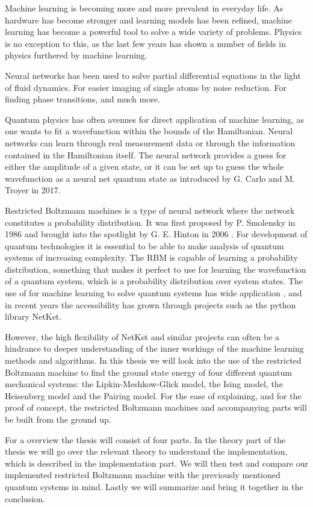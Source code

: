 Machine learning is becoming more and more prevalent in everyday life. As hardware has become stronger and learning models has been refined, machine learning has become a powerful tool to solve a wide variety of problems. Physics is no exception to this, as the last few years has shown a number of fields in physics furthered by machine learning. 

Neural networks has been used to solve partial differential equations in the light of fluid dynamics\cite{RAISSI2019686}. For easier imaging of single atoms by noise reduction\cite{PhysRevApplied.14.014011}. For finding phase transitions\cite{vanNieuwenburg2017}, and much more.

Quantum physics has often avenues for direct application of machine learning, as one wants to fit a wavefunction within the bounds of the Hamiltonian. Neural networks can learn through real measurement data or through the information contained in the Hamiltonian itself. The neural network provides a guess for either the amplitude of a given state, or it can be set up to guess the whole wavefunction as a neural net quantum state as introduced by G. Carlo and M. Troyer in 2017\cite{Carleo_2017}.

Restricted Boltzmann machines is a type of neural network where the network constitutes a probability distribution. It was first proposed by P. Smolensky in 1986 \cite{paul} and brought into the spotlight by G. E. Hinton in 2006 \cite{gehinton}. For development of quantum technologies it is essential to be able to make analysis of quantum systems of increasing complexity. The RBM is capable of learning a probability distribution, something that makes it perfect to use for learning the wavefunction of a quantum system, which is a probability distribution over system states. The use of for machine learning to solve quantum systems has wide application \cite{Xia2018}\cite{PhysRevLett.108.058301}, and in recent years the accessibility has grown through projects such as the python library NetKet\cite{netket3:2022}\cite{netket2:2019}\cite{mpi4jax:2021}. 

However, the high flexibility of NetKet and similar projects can often be a hindrance to deeper understanding of the inner workings of the machine learning methods and algorithms. In this thesis we will look into the use of the restricted Boltzmann machine to find the ground state energy of four different quantum mechanical systems: the Lipkin-Meshkow-Glick model, the Ising model, the Heisenberg model and the Pairing model. For the ease of explaining, and for the proof of concept, the restricted Boltzmann machines and accompanying parts will be built from the ground up.

For a overview the thesis will consist of four parts. In the theory part of the thesis we will go over the relevant theory to understand the implementation, which is described in the implementation part. We will then test and compare our implemented restricted Boltzmann machine with the previously mentioned quantum systems in mind. Lastly we will summarize and bring it together in the conclusion.

